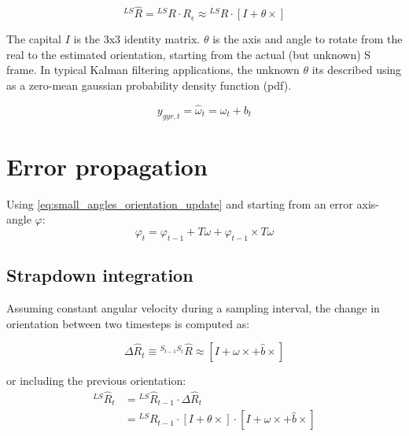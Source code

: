 \documentclass{article}
\begin{document}
\begin{equation} \label{eq:orientation_error_definition}
{}^{LS} \hat{R} = {}^{LS} R \cdot R_{\epsilon} \approx {}^{LS} R \cdot \left[ I + \theta\times  \right]
\end{equation}

The capital $I$ is the 3x3 identity matrix. $\theta$ is the axis and angle to rotate from the real to the estimated orientation, starting from the actual (but unknown) S frame. In typical Kalman filtering applications, the unknown $\theta$ its described using as a zero-mean gaussian probability density function (pdf).

\begin{equation} \label{eq:angular_velocity_model}
y_{gyr,t} =  \hat{\omega}_t = \omega_t + b_t
\end{equation}

\section{Error propagation}
Using \ref{eq:small_angles_orientation_update} and starting from an error axis-angle $\varphi$:
\begin{equation} \label{eq:phi_propagation}
\varphi_t =  \varphi_{t-1} + T\omega + \varphi_{t-1} \times T\omega 
\end{equation}

\subsection{Strapdown integration}
Assuming constant angular velocity during a sampling interval, the change in orientation between two timesteps is computed as:

\begin{equation} \label{eq:strapdown_orientation_including_bias}
\Delta \hat{R}_t \equiv {}^{S_{t-1}S_t} \hat{R} \approx \left[ I + \omega \times   +  \hat{b}\times  \right]
\end{equation}

or including the previous orientation:
\begin{equation} \label{eq:strapdown_orientation_propagation_rotation_matrix}
\begin{aligned}
{}^{LS} \hat{R}_t &= {}^{LS} \hat{R}_{t-1} \cdot  \Delta \hat{R}_t  \\
&= {}^{LS} R_{t-1} \cdot \left[ I + \theta\times  \right] \cdot \left[ I + \omega \times   +  \hat{b}\times  \right] 
\end{aligned}
\end{equation}
\end{document}
